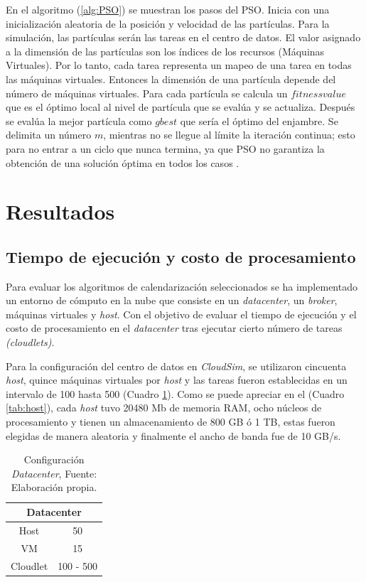 \documentclass[jou,apacite]{apa6}
\begin{document}
En el algoritmo (\ref{alg:PSO}) se muestran los pasos del PSO. Inicia con una inicialización aleatoria de la posición y velocidad de las partículas. Para la simulación, las partículas serán las tareas en el centro de datos.
El valor asignado a la dimensión de las partículas son los índices de los recursos (Máquinas Virtuales). Por lo tanto, cada tarea representa un mapeo de una tarea en todas las máquinas virtuales. Entonces la dimensión de una partícula depende del número de máquinas virtuales.
Para cada partícula se calcula un $fitnessvalue$ que es el óptimo local al nivel de partícula que se evalúa y se actualiza. 
Después se evalúa la mejor partícula como $gbest$ que sería el óptimo del enjambre.
Se delimita un número $m$, mientras no se llegue al límite la iteración continua; esto para no entrar a un ciclo que nunca termina, ya que PSO  no garantiza la obtención de una solución óptima en todos los casos \cite{osman2012}.

\section{Resultados}

\subsection{Tiempo de ejecuci\'on y costo de procesamiento}


Para evaluar los algoritmos de calendarizaci\'on seleccionados se ha implementado un entorno de c\'omputo en la nube que consiste en un \textit{datacenter}, un \textit{broker}, m\'aquinas virtuales y \textit{host}.  Con el objetivo de evaluar el tiempo de ejecuci\'on y el costo de procesamiento en el \textit{datacenter} tras ejecutar cierto n\'umero de tareas \textit{(cloudlets)}.

Para la configuraci\'on del centro de datos en \textit{CloudSim}, se utilizaron cincuenta \textit{host}, quince m\'aquinas virtuales por \textit{host} y las tareas fueron establecidas en un intervalo de 100 hasta 500 (Cuadro \ref{table:datacenter}).
Como se puede apreciar en el (Cuadro \ref{tab:host}), cada \textit{host} tuvo 20480 Mb de memoria RAM, ocho n\'ucleos de procesamiento y tienen un almacenamiento de 800 GB \'o 1 TB, estas fueron elegidas de manera aleatoria y finalmente el ancho de banda fue de 10 GB/s.

\setcounter{table}{0}
\renewcommand\thetable{\arabic{table}}
\begin{table}[h!]
	\centering
	\begin{tabular}{@{}cc@{}}
		\toprule
		\multicolumn{2}{c}{{\bf Datacenter}} \\ \midrule
		Host              & 50               \\
		VM                & 15                \\
		Cloudlet          & 100 - 500          \\ \bottomrule
		
	\end{tabular}
	\caption{Configuraci\'on \textit{Datacenter}, Fuente: Elaboraci\'on propia.}
	\label{table:datacenter}
\end{table}
 
\end{document}
